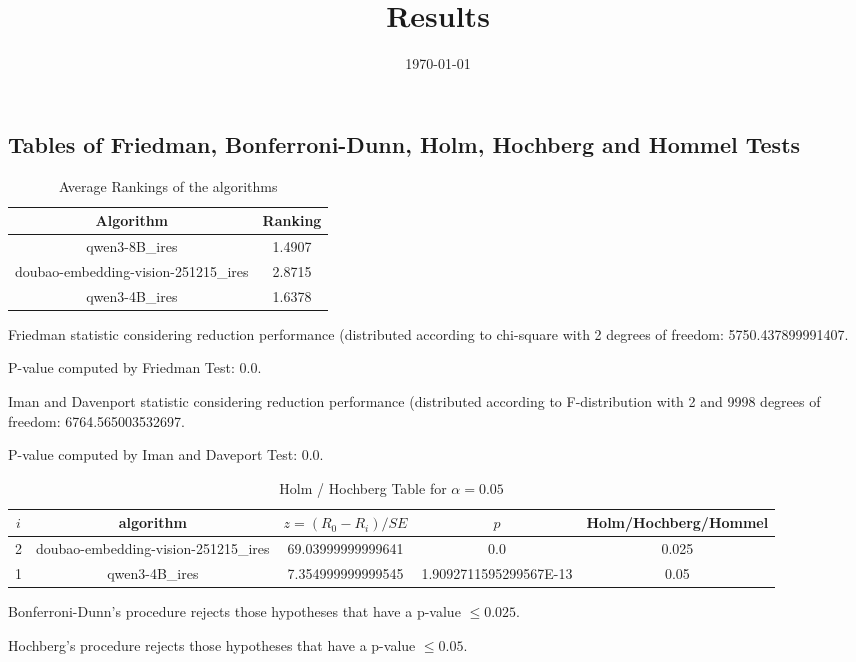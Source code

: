 \documentclass[a4paper,10pt]{article}
\title{Results}
\date{\today}
\begin{document}
\begin{landscape}
\oddsidemargin 0in \topmargin 0in\maketitle
\section{Tables of Friedman, Bonferroni-Dunn, Holm, Hochberg and Hommel Tests}
\begin{table}[!htp]
\centering
\caption{Average Rankings of the algorithms
}\begin{tabular}{c|c}
Algorithm&Ranking\\
\hline
qwen3-8B_ires&1.4907\\
doubao-embedding-vision-251215_ires&2.8715\\
qwen3-4B_ires&1.6378\\
\end{tabular}
\end{table}


Friedman statistic considering reduction performance (distributed according to chi-square with 2 degrees of freedom: 5750.437899991407.


P-value computed by Friedman Test: 0.0.\newline

Iman and Davenport statistic considering reduction performance (distributed according to F-distribution with 2 and 9998 degrees of freedom: 6764.565003532697.


P-value computed by Iman and Daveport Test: 0.0.\newline

\begin{table}[!htp]
\centering\tiny
\caption{Holm / Hochberg Table for $\alpha=0.05$}
\begin{tabular}{ccccc}
$i$&algorithm&$z=(R_0 - R_i)/SE$&$p$&Holm/Hochberg/Hommel\\
\hline
2&doubao-embedding-vision-251215_ires&69.03999999999641&0.0&0.025\\
1&qwen3-4B_ires&7.354999999999545&1.9092711595299567E-13&0.05\\
\hline
\end{tabular}
\end{table}
Bonferroni-Dunn's procedure rejects those hypotheses that have a p-value $\le0.025$.


Hochberg's procedure rejects those hypotheses that have a p-value $\le0.05$.



\end{landscape}
\end{document}
